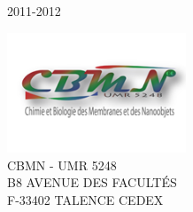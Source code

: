 \begin{titlepage}
\begin{center}
\vfill

\begin{center}
2011-2012
\end{center}
\includegraphics[width=0.4\textwidth]{./banniere_cbmn.png}\\[1cm]
CBMN - UMR 5248 \\
B8 AVENUE DES FACULTÉS \\
F-33402 TALENCE CEDEX \\


\end{center}

\end{titlepage}
%